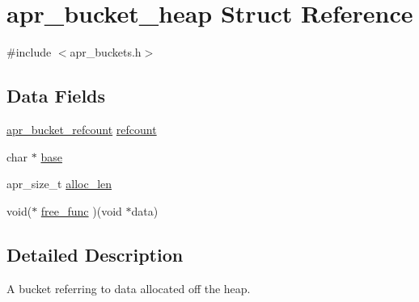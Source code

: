 \hypertarget{structapr__bucket__heap}{\section{apr\-\_\-bucket\-\_\-heap Struct Reference}
\label{structapr__bucket__heap}
}


{\ttfamily \#include $<$apr\-\_\-buckets.\-h$>$}

\subsection*{Data Fields}
\begin{DoxyCompactItemize}
\item 
\hyperlink{structapr__bucket__refcount}{apr\-\_\-bucket\-\_\-refcount} \hyperlink{structapr__bucket__heap_ab87003dea25caef69aa3b30a1948024e}{refcount}
\item 
char $\ast$ \hyperlink{structapr__bucket__heap_ac6386e2f635c6af19075123749e1fa71}{base}
\item 
apr\-\_\-size\-\_\-t \hyperlink{structapr__bucket__heap_ae373dada96f2e005a6aaf80e41c4cf6d}{alloc\-\_\-len}
\item 
void($\ast$ \hyperlink{structapr__bucket__heap_aac6fce0089a10b2b139c28edf9ad6fea}{free\-\_\-func} )(void $\ast$data)
\end{DoxyCompactItemize}


\subsection{Detailed Description}
A bucket referring to data allocated off the heap. 

